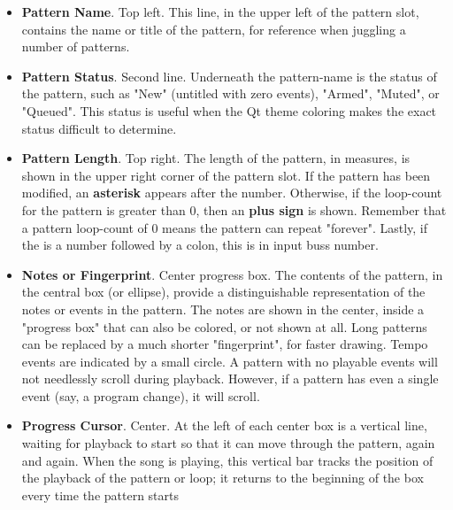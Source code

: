    \begin{itemize}
      \item \textbf{Pattern Name}. Top left.
         This line, in the upper left of the pattern slot, contains the name or
         title of the pattern, for reference when juggling a number of
         patterns.
      \item \textbf{Pattern Status}. Second line.
         Underneath the pattern-name is the status of the pattern, such as
         "New" (untitled with zero events), "Armed", "Muted", or "Queued".
         This status is useful when the Qt theme coloring makes the exact
         status difficult to determine.
      \item \textbf{Pattern Length}. Top right.
         The length of the pattern, in measures, is shown in the upper
         right corner of the pattern slot.
         If the pattern has been modified, an \textbf{asterisk}
         appears after the
         number.
         Otherwise, if the loop-count for the pattern is greater than 0, 
         then an \textbf{plus sign} is shown.
         Remember that a pattern loop-count of 0 means the pattern can repeat
         "forever".
         Lastly, if the is a number followed by a colon, this is
         in input buss number.
      \item \textbf{Notes or Fingerprint}. Center progress box.
         The contents of the pattern, in the central box (or ellipse),
         provide a distinguishable representation of the notes or events in the
         pattern.
         The notes are shown in the center, inside a "progress box" that
         can also be colored, or not shown at all.
         Long patterns can be replaced by a much shorter "fingerprint", for
         faster drawing.
         Tempo events are indicated by a small circle.
         A pattern with no playable events will not needlessly scroll
         during playback.
         However, if a pattern has even a single event (say, a program change),
         it will scroll.
      \item \textbf{Progress Cursor}. Center.
         At the left of each center box is a vertical line, waiting for
         playback to start so that it can move through the pattern, again and
         again.
         When the song is playing, this vertical bar
         tracks the position of the playback of the pattern or loop; it
         returns to the beginning of the box every time the pattern starts

\end{itemize}
